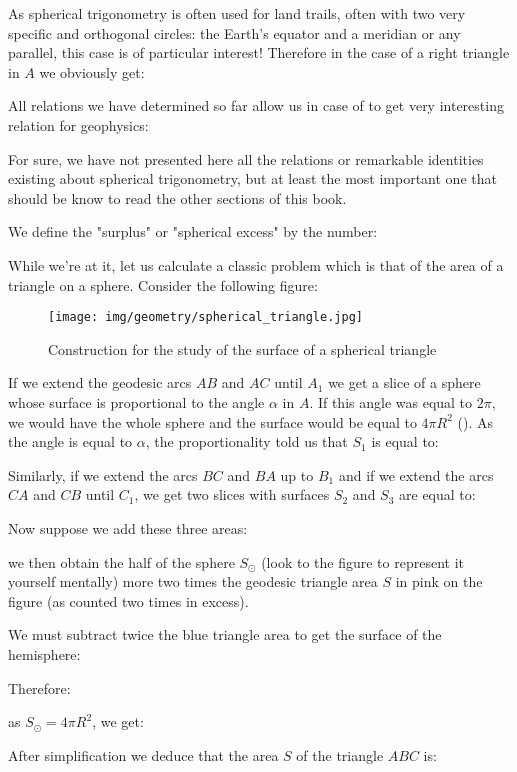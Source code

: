 	As spherical trigonometry is often used for land trails, often with two very specific and orthogonal circles: the Earth's equator and a meridian or any parallel, this case is of particular interest! Therefore in the case of a right triangle in $A$ we obviously get:
	
	All relations we have determined so far allow us in case of to get very interesting relation for geophysics:
	
	For sure, we have not presented here all the relations or remarkable identities existing about spherical trigonometry, but at least the most important one that should be know to read the other sections of this book.
	\begin{tcolorbox}[title=Remark,colframe=black,arc=10pt]
	We define the  "surplus" or "spherical excess" by the number:
	
	\end{tcolorbox}
	While we're at it, let us calculate a classic problem which is that of the area of a triangle on a sphere. Consider the following figure:
	\begin{figure}[H]
		\centering
		\texttt{[image: img/geometry/spherical\_triangle.jpg]}
		\caption[]{Construction for the study of the surface of a spherical triangle}
	\end{figure}
	If we extend the geodesic arcs $AB$ and $AC$ until $A_1$ we get a slice of a sphere whose surface is proportional to the angle $\alpha$ in $A$. If this angle was equal to $2\pi$, we would have the whole sphere and the surface would be equal to $4\pi R^2$ (). As the angle is equal to $\alpha$, the proportionality told us that $S_1$ is equal to:
	
	Similarly, if we extend the arcs $BC$ and $BA$ up to $B_1$ and if we extend the arcs $CA$ and $CB$ until $C_1$, we get two slices with surfaces $S_2$ and $S_3$ are equal to:
	
	Now suppose we add these three areas:
	
	we then obtain the half of the sphere $S_\odot$ (look to the figure to represent it yourself mentally) more two times the geodesic triangle area $S$ in pink on the figure (as counted two times in excess).
	
	We must subtract twice the blue triangle area to get the surface of the hemisphere:
	
	Therefore:
	
	as $S_\odot=4\pi R^2$, we get:
	
	After simplification we deduce that the area $S$ of the triangle $ABC$ is:
	

